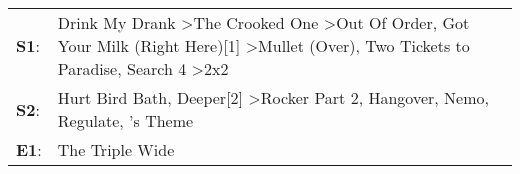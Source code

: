 \begin{supertabular}{p{0.03\textwidth}p{0.92\textwidth}}
 \textbf{S1}:  &  Drink My Drank\textsuperscript{} \textgreater \enspace The Crooked One\textsuperscript{} \textgreater \enspace Out Of Order\textsuperscript{}, \enspace Got Your Milk (Right Here)[1]\textsuperscript{} \textgreater \enspace Mullet (Over)\textsuperscript{}, \enspace Two Tickets to Paradise\textsuperscript{}, \enspace Search 4\textsuperscript{} \textgreater \enspace 2x2\textsuperscript{}  \enspace  \\
 \textbf{S2}:  &                                                                                                                      Hurt Bird Bath\textsuperscript{}, \enspace Deeper[2]\textsuperscript{} \textgreater \enspace Rocker Part 2\textsuperscript{}, \enspace Hangover\textsuperscript{}, \enspace Nemo\textsuperscript{}, \enspace Regulate\textsuperscript{}, 's Theme\textsuperscript{}  \enspace  \\
 \textbf{E1}:  &                                                                                                                                                                                                                                                                                                                                                                   The Triple Wide\textsuperscript{}  \enspace  \\
\end{supertabular}
